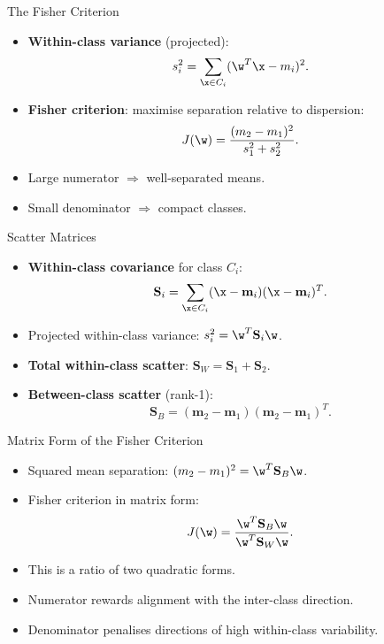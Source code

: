 \begin{frame}{The Fisher Criterion}
  \begin{itemize}
    \item \textbf{Within-class variance} (projected):
    \[
      s_i^2 = \sum_{\x \in C_i} (\w^T\x - m_i)^2.
    \]
    \item \textbf{Fisher criterion}: maximise separation relative to dispersion:
    \[
      J(\w) = \frac{(m_2 - m_1)^2}{s_1^2 + s_2^2}.
    \]
    \item Large numerator $\Rightarrow$ well-separated means.
    \item Small denominator $\Rightarrow$ compact classes.
  \end{itemize}
\end{frame}

\begin{frame}{Scatter Matrices}
  \begin{itemize}
    \item \textbf{Within-class covariance} for class $C_i$:
    \[
      \mathbf{S}_i = \sum_{\x \in C_i} (\x - \mathbf{m}_i)(\x - \mathbf{m}_i)^T.
    \]
    \item Projected within-class variance: $s_i^2 = \w^T\mathbf{S}_i\w$.
    \item \textbf{Total within-class scatter}: $\mathbf{S}_W = \mathbf{S}_1 + \mathbf{S}_2$.
    \item \textbf{Between-class scatter} (rank-1):
    \[
      \mathbf{S}_B = (\mathbf{m}_2 - \mathbf{m}_1)(\mathbf{m}_2 - \mathbf{m}_1)^T.
    \]
  \end{itemize}
\end{frame}

\begin{frame}{Matrix Form of the Fisher Criterion}
  \begin{itemize}
    \item Squared mean separation: $(m_2 - m_1)^2 = \w^T\mathbf{S}_B\w$.
    \item Fisher criterion in matrix form:
    \[
      J(\w) = \frac{\w^T\mathbf{S}_B\w}{\w^T\mathbf{S}_W\w}.
    \]
    \item This is a \alert{ratio of two quadratic forms}.
    \item Numerator rewards alignment with the inter-class direction.
    \item Denominator penalises directions of high within-class variability.
  \end{itemize}
\end{frame}

